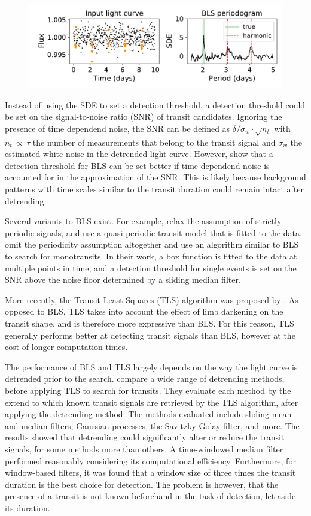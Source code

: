\begin{figure}
    \centering
    \includegraphics[width=0.7\linewidth]{Background/Figures/BLS_example.pdf}
    \caption{}
    \label{fig:bls_example}
\end{figure}

Instead of using the SDE to set a detection threshold, a detection threshold could be set on the signal-to-noise ratio (SNR) of transit candidates. Ignoring the presence of time dependend noise, the SNR can be defined as $\delta / \sigma_w \cdot \sqrt{n_t}$ with $n_t \,\propto\, \tau$ the number of measurements that belong to the transit signal and $\sigma_w$ the estimated white noise in the detrended light curve. However, \cite{pont2006effect} show that a detection threshold for BLS can be set better if time dependend noise is accounted for in the approximation of the SNR. This is likely because background patterns with time scales similar to the transit duration could remain intact after detrending.

Several variants to BLS exist. For example, \cite{carter2013quasiperiodic} relax the assumption of strictly periodic signals, and use a quasi-periodic transit model that is fitted to the data. \cite{foreman2016population} omit the periodicity assumption altogether and use an algorithm similar to BLS to search for monotransits. In their work, a box function is fitted to the data at multiple points in time, and a detection threshold for single events is set on the SNR above the noise floor determined by a sliding median filter.

More recently, the Transit Least Squares (TLS) algorithm was proposed by \cite{hippke2019optimized}. As opposed to BLS, TLS takes into account the effect of limb darkening on the transit shape, and is therefore more expressive than BLS. For this reason, TLS generally performs better at detecting transit signals than BLS, however at the cost of longer computation times.

The performance of BLS and TLS largely depends on the way the light curve is detrended prior to the search. \cite{hippke2019wotan} compare a wide range of detrending methods, before applying TLS to search for transits. They evaluate each method by the extend to which known transit signals are retrieved by the TLS algorithm, after applying the detrending method. The methods evaluated include sliding mean and median filters, Gaussian processes, the Savitzky-Golay filter, and more. The results showed that detrending could significantly alter or reduce the transit signals, for some methods more than others. A time-windowed median filter performed reasonably considering its computational efficiency. Furthermore, for window-based filters, it was found that a window size of three times the transit duration is the best choice for detection. The problem is however, that the presence of a transit is not known beforehand in the task of detection, let aside its duration.

